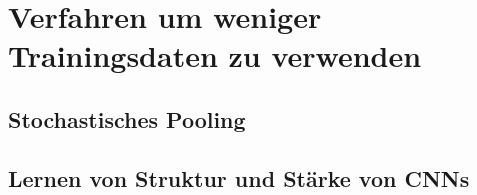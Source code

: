 \chapter{Verfahren um weniger Trainingsdaten zu verwenden}

\section{Stochastisches Pooling}




\section{Lernen von Struktur und Stärke von CNNs}
